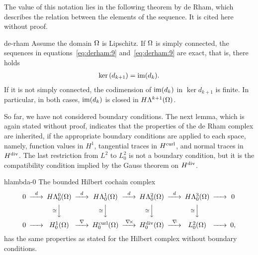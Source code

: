 The value of this notation lies in the following theorem by de Rham,
which describes the relation between the elements of the sequence. It
is cited here without proof.

\begin{Theorem}{de-rham}
  Assume the domain $\Omega$ is Lipschitz.  If $\Omega$ is simply
  connected, the sequences in equations~\eqref{eq:derham:9}
  and~\eqref{eq:derham:9} are exact, that is, there holds
  \begin{gather}
    \label{eq:derham:7}
    \operatorname{ker}\left(d_{k+1}\right) = \operatorname{im}(d_k).
  \end{gather}
  If it is not simply connected, the codimension of $\operatorname{im}(d_k)$ in
  $\ker{d_{k+1}}$ is finite. In particular, in both cases,
  $\operatorname{im}(d_k)$ is closed in $H\Lambda^{k+1}(\Omega)$.
\end{Theorem}

So far, we have not considered boundary conditions. The next lemma,
which is again stated without proof, indicates that the properties of
the de Rham complex are inherited, if the appropriate boundary
conditions are applied to each space, namely, function values in
$H^1$, tangential traces in $H^{\text{curl}}$, and normal traces in
$H^{\text{div}}$. The last restriction from $L^2$ to $L^2_0$ is not a boundary
condition, but it is the compatibility condition implied by the Gauss
theorem on $H^{\text{div}}$.

\begin{Lemma}{hlambda-0}
  The bounded Hilbert cochain complex
  \begin{gather}\minCDarrowwidth20pt
    \begin{CD}
      0
      @>{d}>> H\Lambda^0_0(\domain)
      @>{d}>> H\Lambda^1_0(\domain)
      @>{d}>> H\Lambda^2_0(\domain)
      @>{d}>> H\Lambda^3_0(\domain)
      @>>> 0
      \\
      @.
      @V{\cong}VV
      @V{\cong}VV
      @V{\cong}VV
      @V{\cong}VV
      \\
      0
      @>>> H^1_0(\domain)
      @>{\nabla}>> \Hcurl_0(\domain)
      @>{\curl}>> \Hdiv_0(\domain)
      @>{\div}>> L^2_0(\domain)
      @>>> 0,
    \end{CD}
  \end{gather}
  has the same properties as stated for the Hilbert complex without
  boundary conditions.
\end{Lemma}

  

